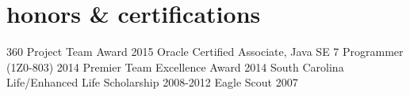 \section{honors \& certifications}
\begin{entrylist}
\honorsentry
{360 Project Team Award}
{2015}
\honorsentry
{Oracle Certified Associate, Java SE 7 Programmer (1Z0-803)}
{2014}
\honorsentry
{Premier Team Excellence Award}
{2014}
\honorsentry
{South Carolina Life/Enhanced Life Scholarship}
{2008-2012}
\honorsentry
{Eagle Scout}
{2007}
\end{entrylist}
